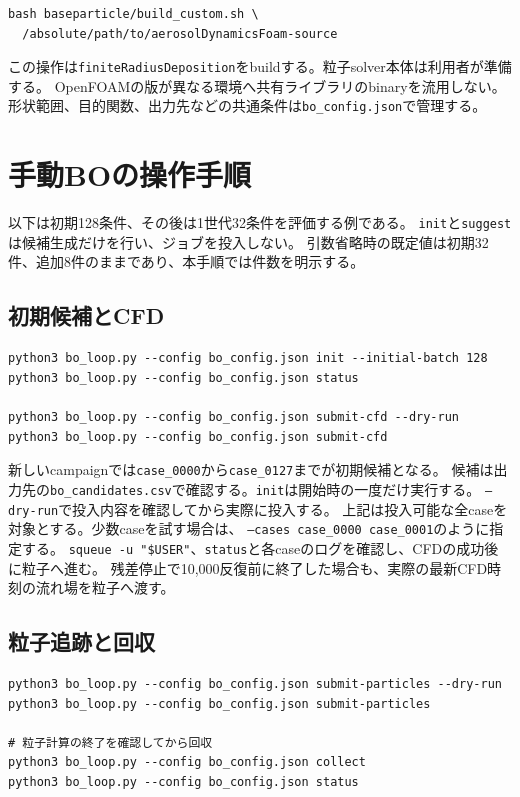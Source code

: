 \documentclass[a4paper,11pt]{article}
\newcommand{\code}[1]{\texttt{#1}}
\begin{document}
\begin{verbatim}
bash baseparticle/build_custom.sh \
  /absolute/path/to/aerosolDynamicsFoam-source
\end{verbatim}

この操作は\code{finiteRadiusDeposition}をbuildする。粒子solver本体は利用者が準備する。
OpenFOAMの版が異なる環境へ共有ライブラリのbinaryを流用しない。
形状範囲、目的関数、出力先などの共通条件は\code{bo\_config.json}で管理する。

\section{手動BOの操作手順}

以下は初期128条件、その後は1世代32条件を評価する例である。
\code{init}と\code{suggest}は候補生成だけを行い、ジョブを投入しない。
引数省略時の既定値は初期32件、追加8件のままであり、本手順では件数を明示する。

\subsection{初期候補とCFD}

\begin{verbatim}
python3 bo_loop.py --config bo_config.json init --initial-batch 128
python3 bo_loop.py --config bo_config.json status

python3 bo_loop.py --config bo_config.json submit-cfd --dry-run
python3 bo_loop.py --config bo_config.json submit-cfd
\end{verbatim}

新しいcampaignでは\code{case\_0000}から\code{case\_0127}までが初期候補となる。
候補は出力先の\code{bo\_candidates.csv}で確認する。\code{init}は開始時の一度だけ実行する。
\code{--dry-run}で投入内容を確認してから実際に投入する。
上記は投入可能な全caseを対象とする。少数caseを試す場合は、
\code{--cases case\_0000 case\_0001}のように指定する。
\code{squeue -u "\$USER"}、\code{status}と各caseのログを確認し、CFDの成功後に粒子へ進む。
残差停止で10,000反復前に終了した場合も、実際の最新CFD時刻の流れ場を粒子へ渡す。

\subsection{粒子追跡と回収}

\begin{verbatim}
python3 bo_loop.py --config bo_config.json submit-particles --dry-run
python3 bo_loop.py --config bo_config.json submit-particles

# 粒子計算の終了を確認してから回収
python3 bo_loop.py --config bo_config.json collect
python3 bo_loop.py --config bo_config.json status
\end{verbatim}
\end{document}
